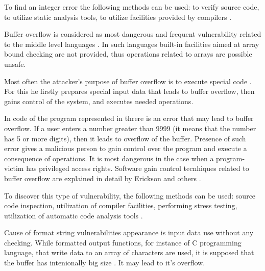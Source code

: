 %
To find an integer error the following methods can be used: to verify source code, to utilize static analysis tools, to utilize facilities provided by compilers  . 



%
Buffer overflow is considered as most dangerous and frequent vulnerability related to the middle level languages . 
%
In such languages built-in facilities aimed at array bound checking are not provided, thus operations related to arrays are possible unsafe. 

%
Most often the attacker's purpose of buffer overflow is to execute special code . 
%
For this he firstly prepares special input data that leads to buffer overflow, then gains control of the system, and executes needed operations. 

%
In code of the program represented in  threre is an error that may lead to buffer overflow. 
%
If a user enters a number greater than 9999 (it means that the number has 5 or more digits), then it leads to overflow of the  buffer. 
%
Presence of such error gives a malicious person to gain control over the program and execute a consequence of operations. 
%
It is most dangerous in the case when a program-victim has privileged access rights. 
%
Software gain control tecnhiques related to buffer overflow are explained in detail by Erickson and others  . 

%
To discover this type of vulnerability, the following methods can be used: source code inspection, utilization of compiler facilities, performing stress testing, utilization of automatic code analysis tools   . 



%
Cause of format string vulnerabilities appearance is input data use without any checking. 
%
While formatted output functions, for instance  of C programming language, that write data to an array of characters are used, it is supposed that the buffer has intenionally big size . 
%
It may lead to it's overflow. 

